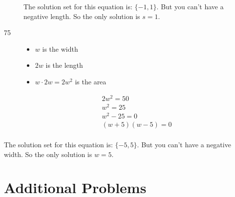 \documentclass[fleqn,addpoints]{exam}
\begin{document}
\begin{description}
The solution set for this equation is: $\{-1, 1\}$.  But you can't have a negative length.  So the only
solution is $s = 1$.




\item[75] 
\begin{itemize}
  \item $w$ is the width
  \item $2w$ is the length
  \item $w \cdot 2w = 2w^2$ is the area
\end{itemize}

\begin{align*}
  2w^2 = 50 \\
  w^2 = 25 \\
  w^2 - 25 = 0 \\
  (w + 5)(w - 5) = 0 \\
\end{align*}
\end{description}

The solution set for this equation is: $\{-5, 5\}$.  But you can't have a negative width.  So the only
solution is $w = 5$.

\section{Additional Problems}
\end{document}
